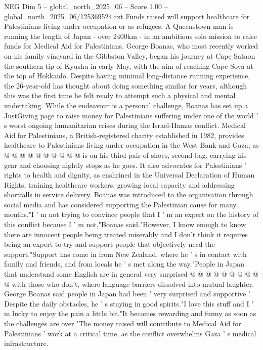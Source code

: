 \begin{textsample}{NEG Dim 5 – global\_north\_2025\_06 – Score 1.00 – global\_north\_2025\_06/125369524.txt}  \label{ex:f5_neg_386}
Funds raised will support healthcare for Palestinians living under occupation or as refugees.
A Queenstown man is running the length of Japan - over 2400km - in an ambitious solo mission to raise funds for Medical Aid for Palestinians.
George Boanas, who most recently worked on his family vineyard in the Gibbston Valley, began his journey at Cape Sataon the southern tip of Kyushu in early May, with the aim of reaching Cape Soya at the top of Hokkaido.
Despite having minimal long-distance running experience, the 26-year-old has thought about doing something similar for years, although this was the first time he felt ready to attempt such a physical and mental undertaking.
While the endeavour is a personal challenge, Boanas has set up a JustGiving page to raise money for Palestinians suffering under one of the world ' s worst ongoing humanitarian crises during the Israel-Hamas conflict.
Medical Aid for Palestinians, a British-registered charity established in 1982, provides healthcare to Palestinians living under occupation in the West Bank and Gaza, as @ @ @ @ @ @ @ @ @ @ is on his third pair of shoes, second bag, carrying his gear and choosing nightly stops as he goes.
It also advocates for Palestinians ' rights to health and dignity, as enshrined in the Universal Declaration of Human Rights, training healthcare workers, growing local capacity and addressing shortfalls in service delivery.
Boanas was introduced to the organisation through social media and has considered supporting the Palestinian cause for many months."I ' m not trying to convince people that I ' m an expert on the history of this conflict because I ' m not,"Boanas said."However, I know enough to know there are innocent people being treated miserably and I don't think it requires being an expert to try and support people that objectively need the support."Support has come in from New Zealand, where he ' s in contact with family and friends, and from locals he ' s met along the way."People in Japan that understand some English are in general very surprised @ @ @ @ @ @ @ @ @ @ with those who don't, where language barriers dissolved into mutual laughter.
George Boanas said people in Japan had been ' very surprised and supportive '.
Despite the daily obstacles, he ' s staying in good spirits."I love this stuff and I ' m lucky to enjoy the pain a little bit."It becomes rewarding and funny as soon as the challenges are over."The money raised will contribute to Medical Aid for Palestinians ' work at a critical time, as the conflict overwhelms Gaza ' s medical infrastructure.

\end{textsample}
